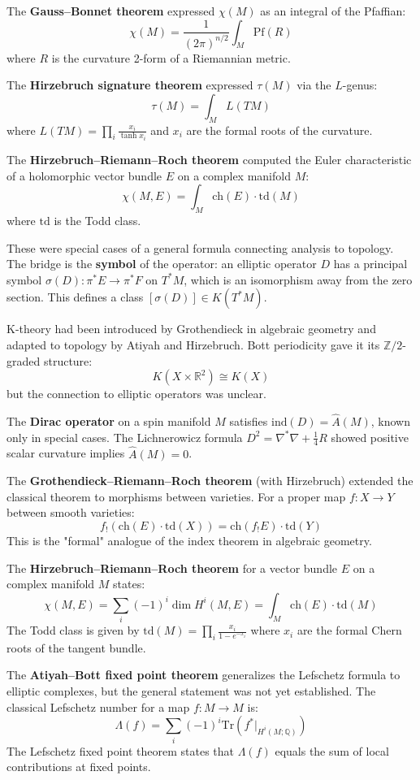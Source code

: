The \textbf{Gauss--Bonnet theorem} expressed $\chi(M)$ as an integral of the
Pfaffian:
\[\chi(M) = \frac{1}{(2\pi)^{n/2}} \int_M \text{Pf}(R)\]
where $R$ is the curvature 2-form of a Riemannian metric.

The \textbf{Hirzebruch signature theorem} expressed $\tau(M)$ via the $L$-genus:
\[\tau(M) = \int_M L(TM)\]
where $L(TM) = \prod_i \frac{x_i}{\tanh x_i}$ and $x_i$ are the formal roots
of the curvature.

The \textbf{Hirzebruch--Riemann--Roch theorem} computed the Euler characteristic
of a holomorphic vector bundle $E$ on a complex manifold $M$:
\[\chi(M, E) = \int_M \text{ch}(E) \cdot \text{td}(M)\]
where $\text{td}$ is the Todd class.

These were special cases of a general formula connecting analysis to topology.
The bridge is the \textbf{symbol} of the operator: an elliptic operator $D$ has
a principal symbol $\sigma(D): \pi^*E \to \pi^*F$ on $T^*M$, which is an
isomorphism away from the zero section. This defines a class
$[\sigma(D)] \in K(T^*M)$.

K-theory had been introduced by Grothendieck in algebraic geometry and adapted
to topology by Atiyah and Hirzebruch. Bott periodicity gave it its
$\mathbb{Z}/2$-graded structure:
\[K(X \times \mathbb{R}^2) \cong K(X)\]
but the connection to elliptic operators was unclear.

The \textbf{Dirac operator} on a spin manifold $M$ satisfies
$\text{ind}(D) = \widehat{A}(M)$, known only in special cases. The
Lichnerowicz formula $D^2 = \nabla^*\nabla + \frac{1}{4}R$ showed positive
scalar curvature implies $\widehat{A}(M) = 0$.

The \textbf{Grothendieck--Riemann--Roch theorem} (with Hirzebruch) extended
the classical theorem to morphisms between varieties. For a proper map
$f: X \to Y$ between smooth varieties:
\[f_!(\text{ch}(E) \cdot \text{td}(X)) = \text{ch}(f_!E) \cdot \text{td}(Y)\]
This is the "formal" analogue of the index theorem in algebraic geometry.

The \textbf{Hirzebruch--Riemann--Roch theorem} for a vector bundle $E$ on a
complex manifold $M$ states:
\[\chi(M, E) = \sum_i (-1)^i \dim H^i(M, E) = \int_M \text{ch}(E) \cdot \text{td}(M)\]
The Todd class is given by $\text{td}(M) = \prod_i \frac{x_i}{1 - e^{-x_i}}$
where $x_i$ are the formal Chern roots of the tangent bundle.

The \textbf{Atiyah--Bott fixed point theorem} generalizes the Lefschetz formula
to elliptic complexes, but the general statement was not yet established.
The classical Lefschetz number for a map $f: M \to M$ is:
\[\Lambda(f) = \sum_i (-1)^i \text{Tr}(f^*|_{H^i(M;\mathbb{Q})})\]
The Lefschetz fixed point theorem states that $\Lambda(f)$ equals the sum
of local contributions at fixed points.

